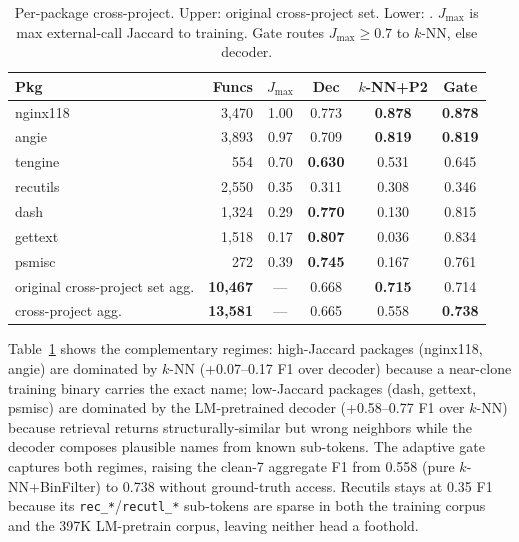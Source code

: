 \documentclass[sigconf,nonacm]{acmart}
\begin{document}
\begin{table}[t]
    \centering
    \caption{Per-package cross-project. Upper: original cross-project set. Lower: . $J_{\max}$ is max external-call Jaccard to training. Gate routes $J_{\max}\!\ge\!0.7$ to $k$-NN, else decoder.}
    \label{tab:perpackage}
    \footnotesize
    \begin{tabular}{lrcccc}
        \toprule
        \textbf{Pkg} & \textbf{Funcs} & \boldmath$J_{\max}$ & \textbf{Dec} & \textbf{$k$-NN+P2} & \textbf{Gate} \\
        \midrule
        nginx118 & 3{,}470 & 1.00 & 0.773 & \textbf{0.878} & \textbf{0.878} \\
        angie    & 3{,}893 & 0.97 & 0.709 & \textbf{0.819} & \textbf{0.819} \\
        tengine  &    554 & 0.70 & \textbf{0.630} & 0.531 & 0.645 \\
        recutils & 2{,}550 & 0.35 & 0.311 & 0.308 & 0.346 \\
        \midrule
        dash     & 1{,}324 & 0.29 & \textbf{0.770} & 0.130 & 0.815 \\
        gettext  & 1{,}518 & 0.17 & \textbf{0.807} & 0.036 & 0.834 \\
        psmisc   &    272 & 0.39 & \textbf{0.745} & 0.167 & 0.761 \\
        \midrule
        original cross-project set agg. & \textbf{10{,}467} & --- & 0.668 & \textbf{0.715} & 0.714 \\
        cross-project agg. & \textbf{13{,}581} & --- & 0.665 & 0.558 & \textbf{0.738} \\
        \bottomrule
    \end{tabular}
\end{table}

Table~\ref{tab:perpackage} shows the complementary regimes: high-Jaccard packages (nginx118, angie) are dominated by $k$-NN (+0.07--0.17 F1 over decoder) because a near-clone training binary carries the exact name; low-Jaccard packages (dash, gettext, psmisc) are dominated by the LM-pretrained decoder (+0.58--0.77 F1 over $k$-NN) because retrieval returns structurally-similar but wrong neighbors while the decoder composes plausible names from known sub-tokens. The adaptive gate captures both regimes, raising the clean-7 aggregate F1 from 0.558 (pure $k$-NN+BinFilter) to 0.738 without ground-truth access. Recutils stays at 0.35 F1 because its \texttt{rec\_*}/\texttt{recutl\_*} sub-tokens are sparse in both the training corpus and the 397K LM-pretrain corpus, leaving neither head a foothold.
\end{document}
